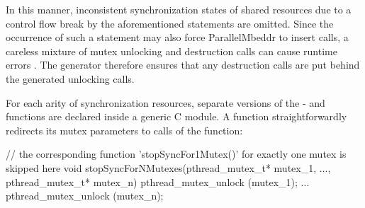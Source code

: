 In this manner, inconsistent synchronization states of shared resources due to a control flow break by the aforementioned statements are omitted. Since the occurrence of such a statement may also force ParallelMbeddr to insert  calls, a careless mixture of mutex unlocking and destruction calls can cause runtime errors \cite{Mutexes}. The generator therefore ensures that any destruction calls are put behind the generated unlocking calls.

For each arity of synchronization resources, separate versions of the - and  functions are declared inside a generic C module. A  function straightforwardly redirects its mutex parameters to calls of the  function:
\begin{ccode}
// the corresponding function 'stopSyncFor1Mutex()' for exactly one mutex is skipped here
void stopSyncForNMutexes(pthread_mutex_t* mutex_1, ..., pthread_mutex_t* mutex_n) { 
  pthread_mutex_unlock (mutex_1);
  ...
  pthread_mutex_unlock (mutex_n); 
}
\end{ccode}

